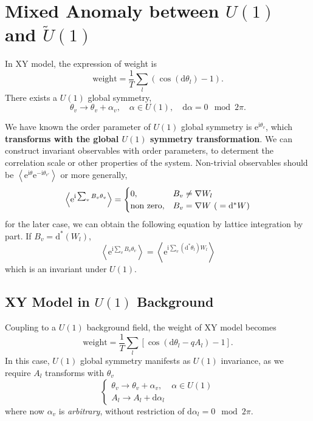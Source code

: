 
\section{Mixed Anomaly between $U(1)$ and $\tilde{U}(1)$}
In XY model, the expression of weight is
\begin{equation}
  \text{weight} = \frac{1}{T} \sum_{l} \left( \cos (\mathrm{d} \theta_{l}) -1\right).
\end{equation}
There exists a $U(1)$ global symmetry,
\begin{equation}
  \theta_{v} \to \theta_{v} + \alpha_{v},\quad \alpha \in U(1), \quad \mathrm{d} \alpha = 0 \mod 2\pi.
\end{equation}

We have known the order parameter of $U(1)$ global symmetry is $\mathrm{e}^{\mathrm{i}\theta_{v}}$, which \textbf{transforms with the global $U(1)$ symmetry transformation}.
We can construct invariant observables with order parameters, to determent the correlation scale or other properties of the system. Non-trivial observables should be $\left< \mathrm{e}^{\mathrm{i} \theta} \mathrm{e}^{- \mathrm{i}\theta_{v'}} \right>$ or more generally, 
\begin{equation}
  \left< \mathrm{e}^{ \mathrm{i} \sum_{v} B_v \theta _{v}} \right> =
  \begin{cases}
    0, & B_v \neq \nabla W_l \\
    $non zero$, & B_v = \nabla W \ ({}= \mathrm{d} ^{*} W)
  \end{cases}
\end{equation}
for the later case, we can obtain the following equation by lattice integration by part. If $B_v = \mathrm{d} ^{*} \left( W_l \right)$,
\begin{equation}
  \left< \mathrm{e}^{\mathrm{i}\sum_{v} B_v \theta_{v}} \right> = \left< \mathrm{e}^{\mathrm{i}\sum_{v} \left( \mathrm{d}^{*} \theta_{l} \right)W_l} \right>
\end{equation}
which is an invariant under $U(1)$.

\subsection{XY Model in $U(1)$ Background}
Coupling to a $U(1)$ background field, the weight of XY model becomes
\begin{equation}
  \text{weight} = \frac{1}{T} \sum_{l}  \left[ \cos \left( \mathrm{d} \theta_{l} - q A_l \right) -1 \right].
\end{equation}
In this case, $U(1)$ global symmetry manifests as $U(1)$ invariance, as we require $A_l$ transforms with $\theta_{v}$
\begin{equation}
  \begin{cases}
    \theta_{v} \to \theta_{v} + \alpha _{v}, & \alpha \in  U(1) \\
    A_l \to A_l + \mathrm{d} \alpha _{l}
  \end{cases}
\end{equation}
where now $\alpha _{v}$ is \emph{arbitrary}, without restriction of $\mathrm{d} \alpha _{l} = 0 \mod 2 \pi $.


